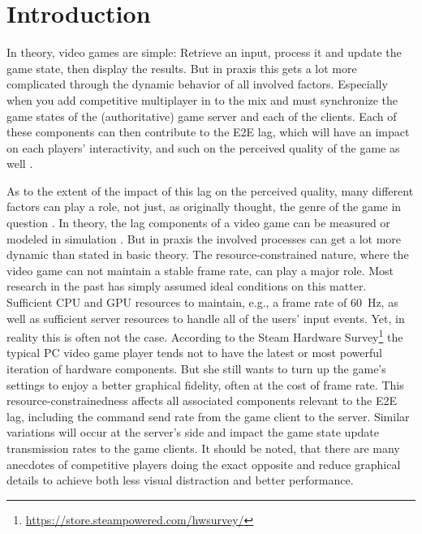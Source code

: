 
\section{Introduction}

In theory, video games are simple: Retrieve an input, process it and update the game state, then display the results. But in praxis this gets a lot more complicated through the dynamic behavior of all involved factors. Especially when you add competitive multiplayer in to the mix and must synchronize the game states of the (authoritative) game server and each of the clients. Each of these components can then contribute to the \gls{E2E} lag, which will have an impact on each players' interactivity, and such on the perceived quality of the game as well \cite{Claypool:2006:LPA:1167838.1167860,7965676}. 

As to the extent of the impact of this lag on the perceived quality, many different factors can play a role, not just, as originally thought, the genre of the game in question \cite{mollertowards,Slivar:2016:CGQ:2910017.2910602}. In theory, the lag components of a video game can be measured \cite{7148095} or modeled in simulation \cite{Metzger+2016}. But in praxis the involved processes can get a lot more dynamic than stated in basic theory. The resource-constrained nature, where the video game can not maintain a stable frame rate, can play a major role. Most research in the past has simply assumed ideal conditions on this matter. Sufficient CPU and GPU resources to maintain, e.g., a frame rate of \SI{60}{\hertz}, as well as sufficient server resources to handle all of the users' input events. Yet, in reality this is often not the case. According to the Steam Hardware Survey\footnote{\url{https://store.steampowered.com/hwsurvey/}} the typical PC video game player tends not to have the latest or most powerful iteration of hardware components. But she still wants to turn up the game's settings to enjoy a better graphical fidelity, often at the cost of frame rate. This resource-constrainedness affects all associated components relevant to the \gls{E2E} lag, including the command send rate from the game client to the server. Similar variations will occur at the server's side and impact the game state update transmission rates to the game clients. It should be noted, that there are many anecdotes of competitive players doing the exact opposite and reduce graphical details to achieve both less visual distraction and better performance.

